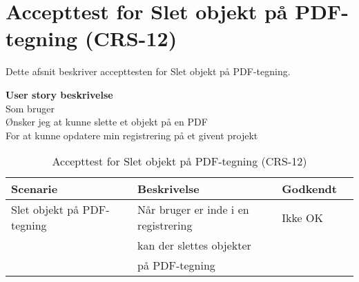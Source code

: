 \section{Accepttest for Slet objekt på PDF-tegning (CRS-12)}
Dette afsnit beskriver accepttesten for Slet objekt på PDF-tegning.

\textbf{User story beskrivelse} \\
Som bruger \\
Ønsker jeg at kunne slette et objekt på en PDF \\
For at kunne opdatere min registrering på et givent projekt

\begin{table}[H]
	\centering
	\begin{tabular}{|ll|l|ll|} \hline
		\textbf{Scenarie} &  & \textbf{Beskrivelse}&  \textbf{Godkendt}&  \\ \hline
		Slet objekt på PDF-tegning&  &  Når bruger er inde i en registrering &  Ikke OK&  \\
		& & kan der slettes objekter& & \\ 
		& & på PDF-tegning& & \\ \hline
	\end{tabular}
	\caption{Accepttest for Slet objekt på PDF-tegning (CRS-12)}
	\label{AcceptSlet}
\end{table}